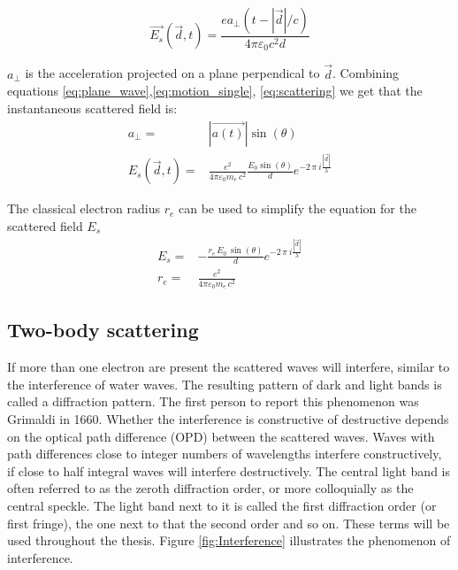 \begin{equation}\label{eq:scattering}
\vec{E_s}(\vec{d},t) = \frac{e a_\perp(t-|\vec{d}|/c)}{4 \pi \varepsilon_0c^2d}
\end{equation}

$a_{\perp}$ is the acceleration projected on a plane perpendical to $\vec{d}$. Combining equations \ref{eq:plane_wave},\ref{eq:motion_single}, \ref{eq:scattering} we get that the instantaneous scattered field is:
\begin{align*}
a_\perp =& |\vec{a(t)}|\sin(\theta)\\
E_s(\vec{d},t) =& \frac{{e}^2}{4 \pi \varepsilon_0 m_e\,c^2} \frac{E_0 \sin(\theta)}{d} e^{-2\,\pi\ i \frac{|\vec{d}|}{\lambda}}
\end{align*}

The classical electron radius $r_e$ can be used to simplify the equation for the scattered field $E_s$
\begin{align*}
E_s=& - \frac{r_e\,E_0\,\sin(\theta)}{d} e^{-2\,\pi\ i \frac{|\vec{d}|}{\lambda}}\\
r_e =& \frac{e^2}{4 \pi \varepsilon_0 m_e\,c^2}    
\end{align*}


\subsection{Two-body scattering}
If more than one electron are present the scattered waves will interfere, similar to the interference of water waves. The resulting pattern of dark and light bands is called a diffraction pattern. The first person to report this phenomenon was Grimaldi in 1660. Whether the interference is constructive of destructive depends on the optical path difference (OPD) between the scattered waves. Waves with path differences close to integer numbers of wavelengths interfere constructively, if close to half integral waves will interfere destructively. The central light band is often referred to as the zeroth diffraction order, or more colloquially as the central speckle. The light band next to it is called the first diffraction order (or first fringe), the one next to that the second order and so on. These terms will be used throughout the thesis. Figure \ref{fig:Interference} illustrates the phenomenon of interference.

